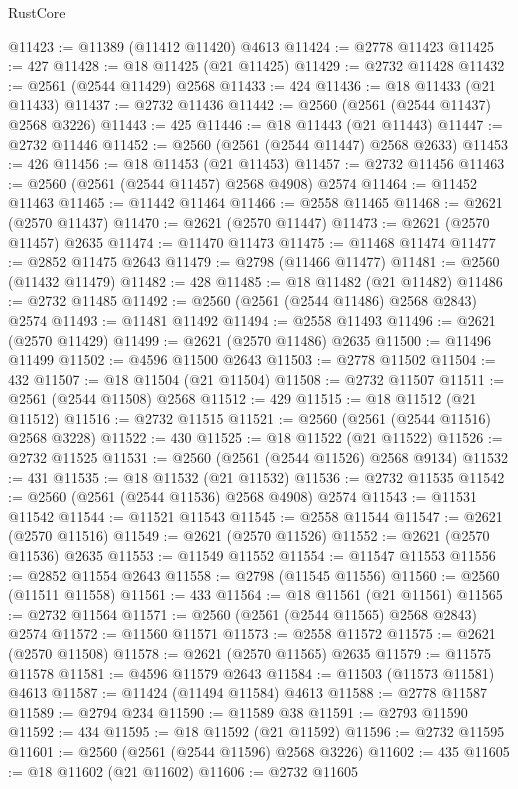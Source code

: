 \begin{lexlean}{RustCore}
\begin{coremodule}
@11423 := @11389 (@11412 @11420) @4613
@11424 := @2778 @11423
@11425 := 427
@11428 := @18 @11425 (@21 @11425)
@11429 := @2732 @11428
@11432 := @2561 (@2544 @11429) @2568
@11433 := 424
@11436 := @18 @11433 (@21 @11433)
@11437 := @2732 @11436
@11442 := @2560 (@2561 (@2544 @11437) @2568 @3226)
@11443 := 425
@11446 := @18 @11443 (@21 @11443)
@11447 := @2732 @11446
@11452 := @2560 (@2561 (@2544 @11447) @2568 @2633)
@11453 := 426
@11456 := @18 @11453 (@21 @11453)
@11457 := @2732 @11456
@11463 := @2560 (@2561 (@2544 @11457) @2568 @4908) @2574
@11464 := @11452 @11463
@11465 := @11442 @11464
@11466 := @2558 @11465
@11468 := @2621 (@2570 @11437)
@11470 := @2621 (@2570 @11447)
@11473 := @2621 (@2570 @11457) @2635
@11474 := @11470 @11473
@11475 := @11468 @11474
@11477 := @2852 @11475 @2643
@11479 := @2798 (@11466 @11477)
@11481 := @2560 (@11432 @11479)
@11482 := 428
@11485 := @18 @11482 (@21 @11482)
@11486 := @2732 @11485
@11492 := @2560 (@2561 (@2544 @11486) @2568 @2843) @2574
@11493 := @11481 @11492
@11494 := @2558 @11493
@11496 := @2621 (@2570 @11429)
@11499 := @2621 (@2570 @11486) @2635
@11500 := @11496 @11499
@11502 := @4596 @11500 @2643
@11503 := @2778 @11502
@11504 := 432
@11507 := @18 @11504 (@21 @11504)
@11508 := @2732 @11507
@11511 := @2561 (@2544 @11508) @2568
@11512 := 429
@11515 := @18 @11512 (@21 @11512)
@11516 := @2732 @11515
@11521 := @2560 (@2561 (@2544 @11516) @2568 @3228)
@11522 := 430
@11525 := @18 @11522 (@21 @11522)
@11526 := @2732 @11525
@11531 := @2560 (@2561 (@2544 @11526) @2568 @9134)
@11532 := 431
@11535 := @18 @11532 (@21 @11532)
@11536 := @2732 @11535
@11542 := @2560 (@2561 (@2544 @11536) @2568 @4908) @2574
@11543 := @11531 @11542
@11544 := @11521 @11543
@11545 := @2558 @11544
@11547 := @2621 (@2570 @11516)
@11549 := @2621 (@2570 @11526)
@11552 := @2621 (@2570 @11536) @2635
@11553 := @11549 @11552
@11554 := @11547 @11553
@11556 := @2852 @11554 @2643
@11558 := @2798 (@11545 @11556)
@11560 := @2560 (@11511 @11558)
@11561 := 433
@11564 := @18 @11561 (@21 @11561)
@11565 := @2732 @11564
@11571 := @2560 (@2561 (@2544 @11565) @2568 @2843) @2574
@11572 := @11560 @11571
@11573 := @2558 @11572
@11575 := @2621 (@2570 @11508)
@11578 := @2621 (@2570 @11565) @2635
@11579 := @11575 @11578
@11581 := @4596 @11579 @2643
@11584 := @11503 (@11573 @11581) @4613
@11587 := @11424 (@11494 @11584) @4613
@11588 := @2778 @11587
@11589 := @2794 @234
@11590 := @11589 @38
@11591 := @2793 @11590
@11592 := 434
@11595 := @18 @11592 (@21 @11592)
@11596 := @2732 @11595
@11601 := @2560 (@2561 (@2544 @11596) @2568 @3226)
@11602 := 435
@11605 := @18 @11602 (@21 @11602)
@11606 := @2732 @11605

\end{coremodule}
\end{lexlean}
